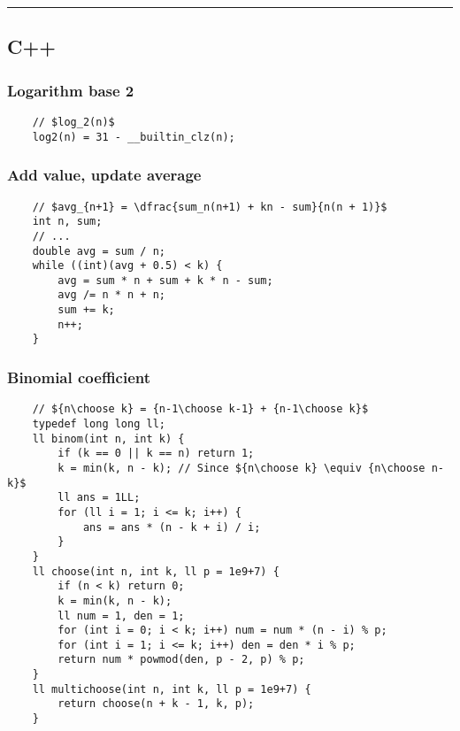 \documentclass{article}
\begin{document}
\noindent\rule{\textwidth}{1pt}

\subsection{C++}
\subsubsection{Logarithm base 2}

\begin{verbatim}
    // $log_2(n)$
    log2(n) = 31 - __builtin_clz(n);
\end{verbatim}


\subsubsection{Add value, update average}
\begin{verbatim}
    // $avg_{n+1} = \dfrac{sum_n(n+1) + kn - sum}{n(n + 1)}$
    int n, sum;
    // ...
    double avg = sum / n;
    while ((int)(avg + 0.5) < k) {
        avg = sum * n + sum + k * n - sum;
        avg /= n * n + n;
        sum += k;
        n++;
    }
\end{verbatim}

\subsubsection{Binomial coefficient}
\begin{verbatim}
    // ${n\choose k} = {n-1\choose k-1} + {n-1\choose k}$
    typedef long long ll;
    ll binom(int n, int k) {
        if (k == 0 || k == n) return 1;
        k = min(k, n - k); // Since ${n\choose k} \equiv {n\choose n-k}$
        ll ans = 1LL;
        for (ll i = 1; i <= k; i++) {
            ans = ans * (n - k + i) / i;
        }
    }
    ll choose(int n, int k, ll p = 1e9+7) {
        if (n < k) return 0;
        k = min(k, n - k);
        ll num = 1, den = 1;
        for (int i = 0; i < k; i++) num = num * (n - i) % p;
        for (int i = 1; i <= k; i++) den = den * i % p;
        return num * powmod(den, p - 2, p) % p;
    }
    ll multichoose(int n, int k, ll p = 1e9+7) {
        return choose(n + k - 1, k, p);
    }
\end{verbatim}
\end{document}

